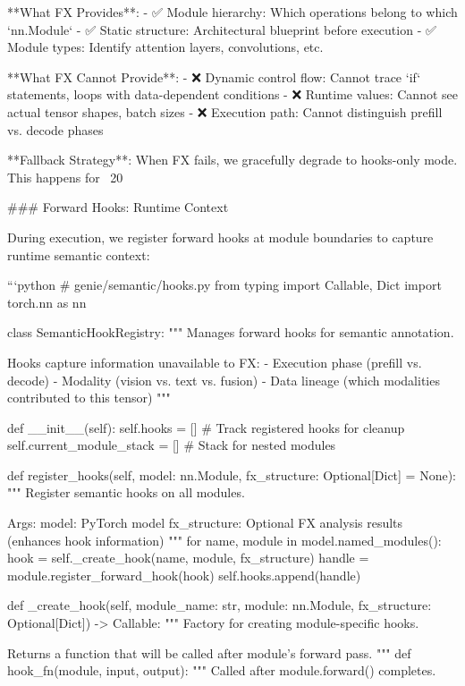 **What FX Provides**:
- ✅ Module hierarchy: Which operations belong to which `nn.Module`
- ✅ Static structure: Architectural blueprint before execution
- ✅ Module types: Identify attention layers, convolutions, etc.

**What FX Cannot Provide**:
- ❌ Dynamic control flow: Cannot trace `if` statements, loops with data-dependent conditions
- ❌ Runtime values: Cannot see actual tensor shapes, batch sizes
- ❌ Execution path: Cannot distinguish prefill vs. decode phases

**Fallback Strategy**: When FX fails, we gracefully degrade to hooks-only mode. This happens for ~20%

### Forward Hooks: Runtime Context

During execution, we register forward hooks at module boundaries to capture runtime semantic context:

```python
# genie/semantic/hooks.py
from typing import Callable, Dict
import torch.nn as nn

class SemanticHookRegistry:
    """
    Manages forward hooks for semantic annotation.
    
    Hooks capture information unavailable to FX:
    - Execution phase (prefill vs. decode)
    - Modality (vision vs. text vs. fusion)
    - Data lineage (which modalities contributed to this tensor)
    """
    
    def __init__(self):
        self.hooks = []  # Track registered hooks for cleanup
        self.current_module_stack = []  # Stack for nested modules
    
    def register_hooks(self, model: nn.Module, fx_structure: Optional[Dict] = None):
        """
        Register semantic hooks on all modules.
        
        Args:
            model: PyTorch model
            fx_structure: Optional FX analysis results (enhances hook information)
        """
        for name, module in model.named_modules():
            hook = self._create_hook(name, module, fx_structure)
            handle = module.register_forward_hook(hook)
            self.hooks.append(handle)
    
    def _create_hook(self, module_name: str, module: nn.Module, 
                     fx_structure: Optional[Dict]) -> Callable:
        """
        Factory for creating module-specific hooks.
        
        Returns a function that will be called after module's forward pass.
        """
        def hook_fn(module, input, output):
            """
            Called after module.forward() completes.
            
